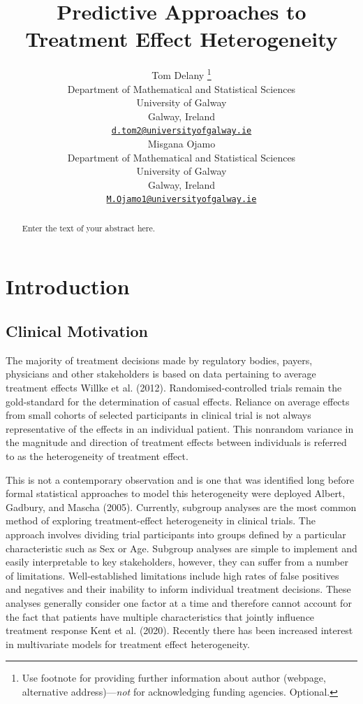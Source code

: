 \documentclass{article}
\title{Predictive Approaches to Treatment Effect Heterogeneity}
\author{
    Tom Delany
    \thanks{Use footnote for providing further information about author
(webpage, alternative address)---\emph{not} for acknowledging funding
agencies. Optional.}
   \\
    Department of Mathematical and Statistical Sciences \\
    University of Galway \\
  Galway, Ireland \\
  \texttt{\href{mailto:d.tom2@universityofgalway.ie}{\nolinkurl{d.tom2@universityofgalway.ie}}} \\
   \And
    Misgana Ojamo
   \\
    Department of Mathematical and Statistical Sciences \\
    University of Galway \\
  Galway, Ireland \\
  \texttt{\href{mailto:M.Ojamo1@universityofgalway.ie}{\nolinkurl{M.Ojamo1@universityofgalway.ie}}} \\
  }
\begin{document}
\maketitle


\begin{abstract}
Enter the text of your abstract here.
\end{abstract}


\section{Introduction}\label{introduction}

\subsection{Clinical Motivation}\label{clinical-motivation}

The majority of treatment decisions made by regulatory bodies, payers,
physicians and other stakeholders is based on data pertaining to average
treatment effects Willke et al. (2012). Randomised-controlled trials
remain the gold-standard for the determination of casual effects.
Reliance on average effects from small cohorts of selected participants
in clinical trial is not always representative of the effects in an
individual patient. This nonrandom variance in the magnitude and
direction of treatment effects between individuals is referred to as the
heterogeneity of treatment effect.

This is not a contemporary observation and is one that was identified
long before formal statistical approaches to model this heterogeneity
were deployed Albert, Gadbury, and Mascha (2005). Currently, subgroup
analyses are the most common method of exploring treatment-effect
heterogeneity in clinical trials. The approach involves dividing trial
participants into groups defined by a particular characteristic such as
Sex or Age. Subgroup analyses are simple to implement and easily
interpretable to key stakeholders, however, they can suffer from a
number of limitations. Well-established limitations include high rates
of false positives and negatives and their inability to inform
individual treatment decisions. These analyses generally consider one
factor at a time and therefore cannot account for the fact that patients
have multiple characteristics that jointly influence treatment response
Kent et al. (2020). Recently there has been increased interest in
multivariate models for treatment effect heterogeneity.
\end{document}
